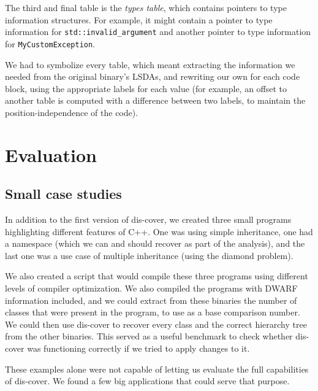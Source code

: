 \documentclass[a4paper,11pt,oneside]{report}
\begin{document}
The third and final table is the \emph{types table}, which contains pointers
to type information structures. For example, it might contain a pointer to
type information for \texttt{std::invalid\_argument} and another pointer to
type information for \texttt{MyCustomException}.

We had to symbolize every table, which meant extracting the information we
needed from the original binary's LSDAs, and rewriting our own for each code
block, using the appropriate labels for each value (for example, an offset to
another table is computed with a difference between two labels, to maintain the
position-independence of the code).

\chapter{Evaluation}
\label{evalchapter}




\section{Small case studies}

In addition to the first version of dis-cover, we created three small programs 
highlighting different features of C++.
One was using simple inheritance,
one had a namespace (which we can and should recover as part of the analysis),
and the last one was a use case of multiple inheritance (using the diamond 
problem).

We also created a script that would compile these three programs using
different levels of compiler optimization.
We also compiled the programs with DWARF information included, and we could
extract from these binaries the number of classes that were present in the
program, to use as a base comparison number.
We could then use dis-cover to recover every class and the correct hierarchy
tree from the other binaries.
This served as a useful benchmark to check whether dis-cover was functioning 
correctly if we tried to apply changes to it.

These examples alone were not capable of letting us evaluate the full 
capabilities of dis-cover.
We found a few big applications that could serve that purpose.
\end{document}
